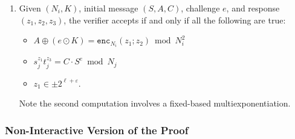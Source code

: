 \documentclass[11pt]{article}
\def\crt{{\sf crt}}
\newcommand{\enc}{\ensuremath{\mathtt{enc}}}
\newcommand{\sk}{\textsf{sk}}
\newcommand{\?}[1]{\stackrel{?}{#1}}
\begin{document}
\begin{enumerate}
    \item Given $(N_i, K)$, initial message $(S, A, C)$, challenge $e$, and response $(z_1, z_2, z_3)$, the verifier accepts if and only if all the following are true:
\begin{itemize}
\item $A \oplus (e \odot K) = \enc_{N_i}(z_1; z_2) \bmod N_i^2$ %
\item    $s_j^{z_1} t_j^{z_3} = C \cdot S^e \bmod N_j$  
\item    $z_1 \in \pm 2^{\ell + \varepsilon}$.
\end{itemize}
Note the second computation involves a fixed-based multiexponentiation.
\end{enumerate}

\subsubsection{Non-Interactive Version of the Proof}
\end{document}
